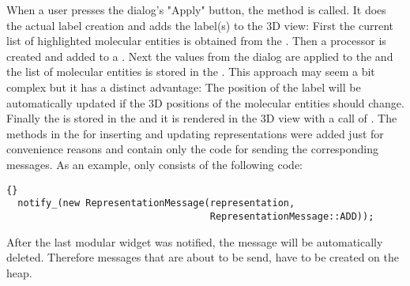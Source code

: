 When a user presses the dialog's "Apply" button, the method  is
called. It does the actual label creation and adds the label(s) to the 3D view:
First the current list of highlighted molecular entities is obtained from the 
. Then a  processor is created and added 
to a . Next the values from the dialog are applied to the
 and the list of molecular entities is stored in the 
. This approach may seem a bit complex but it has a 
distinct advantage: The position of the label will be automatically updated if 
the 3D positions of the molecular entities should change. Finally the 
 is stored in the  and it is 
rendered in the 3D view with a call of 
.
The methods in the  for inserting and updating 
representations were added just for convenience reasons and contain only the 
code for sending the corresponding messages. As an example, 
 only consists of the following 
code:

\begin{lstlisting}{}
  notify_(new RepresentationMessage(representation, 
                                    RepresentationMessage::ADD));
\end{lstlisting}

\noindent
After the last modular widget was notified, the message will be automatically 
deleted. Therefore messages that are about to be send, have to be created on 
the heap.

